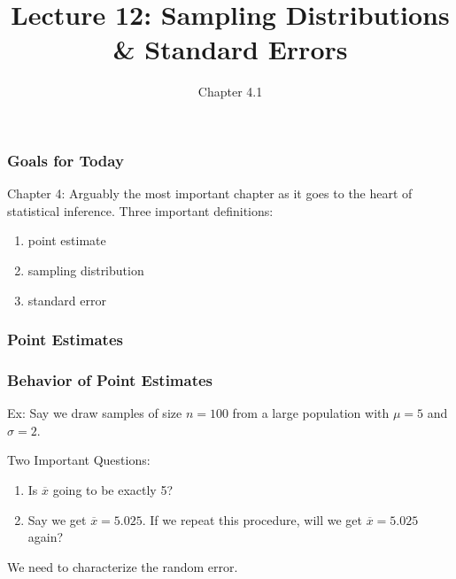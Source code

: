 \documentclass[handout]{beamer}
\title{Lecture 12: Sampling Distributions \& Standard Errors}
\author{Chapter 4.1}
\date{}
\newcommand{\blue}[1]{\textcolor{blue2}{#1}}
\newcommand{\xbar}{\overline{x}}
\begin{document}
\begin{frame}[fragile]
\titlepage
\end{frame}


\begin{frame}[fragile]
\frametitle{Goals for Today}

Chapter 4:  Arguably the most important chapter as it goes to the heart of statistical inference.  Three important definitions:

\vspace{0.5cm}

\begin{enumerate}
\item \blue{point estimate}
\item \blue{sampling distribution}
\item \blue{standard error}
\end{enumerate}


\end{frame}


\begin{frame}[fragile]
\frametitle{Point Estimates}

%
%
%
%

\end{frame}


\begin{frame}[fragile]
\frametitle{Behavior of Point Estimates}
Ex:  Say we draw samples of size $n=100$ from a large population with $\mu=5$ and $\sigma=2$.

\pause \vskip 0.5cm

\blue{Two Important Questions}:
\begin{enumerate}
\pause \item Is $\xbar$ going to be exactly 5?
\pause \item Say we get $\overline{x}=5.025$.  If we repeat this procedure, will we get $\overline{x} = 5.025$ again?
\end{enumerate}

\pause \vskip 0.5cm

We need to characterize the random error.

\end{frame}
\end{document}
